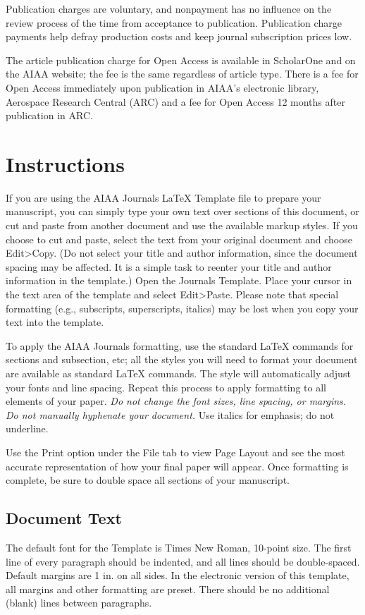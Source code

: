 \documentclass[journal]{new-aiaa}
\begin{document}
Publication charges are voluntary, and nonpayment has no influence on the review process of the time from acceptance to publication. Publication charge payments help defray production costs and keep journal subscription prices low. 

The article publication charge for Open Access is available in ScholarOne and on the AIAA website; the fee is the same regardless of article type. There is a fee for Open Access immediately upon publication in AIAA’s electronic library, Aerospace Research Central (ARC) and a fee for Open Access 12 months after publication in ARC.


\section{Instructions}

If you are using the AIAA Journals \LaTeX{} Template file to prepare your manuscript, you can simply type your own text over sections of this document, or cut and paste from another document and use the available markup styles. If you choose to cut and paste, select the text from your original document and choose Edit>Copy. (Do not select your title and author information, since the document spacing may be affected. It is a simple task to reenter your title and author information in the template.) Open the Journals Template. Place your cursor in the text area of the template and select Edit>Paste. Please note that special formatting (e.g., subscripts, superscripts, italics) may be lost when you copy your text into the template.

To apply the AIAA Journals formatting, use the standard \LaTeX{} commands for sections and subsection, etc; all the styles you will need to format your document are available as standard \LaTeX{} commands. The style will automatically adjust your fonts and line spacing. Repeat this process to apply formatting to all elements of your paper. \emph{Do not change the font sizes, line spacing, or margins. Do not manually hyphenate your document.} Use italics for emphasis; do not underline. 

Use the Print option under the File tab to view Page Layout and see the most accurate representation of how your final paper will appear. Once formatting is complete, be sure to double space all sections of your manuscript.


\subsection{Document Text}
The default font for the Template is Times New Roman, 10-point size. The first line of every paragraph should be indented, and all lines should be double-spaced. Default margins are 1 in. on all sides. In the electronic version of this template, all margins and other formatting are preset. There should be no additional (blank) lines between paragraphs.
\end{document}
